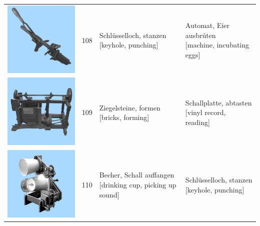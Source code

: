 \documentclass[
  english,
  man,floatsintext]{apa7}
\begin{document}
\begin{center}
\begin{ThreePartTable}
{\begin{longtable}{llll}
\includegraphics[valign=c, scale=0.23]{../materials/unfamiliar/108.png} & 108 & \makecell[l]{Schlüsselloch, stanzen\\{[keyhole, punching]}} & \makecell[l]{Automat, Eier ausbrüten\\{[machine, incubating eggs]}}\\
\includegraphics[valign=c, scale=0.23]{../materials/unfamiliar/109.png} & 109 & \makecell[l]{Ziegelsteine, formen\\{[bricks, forming]}} & \makecell[l]{Schallplatte, abtasten\\{[vinyl record, reading]}}\\
\includegraphics[valign=c, scale=0.23]{../materials/unfamiliar/110.png} & 110 & \makecell[l]{Becher, Schall auffangen\\{[drinking cup, picking up sound]}} & \makecell[l]{Schlüsselloch, stanzen\\{[keyhole, punching]}}\\

\end{longtable}}
\end{ThreePartTable}
\end{center}
\end{document}
